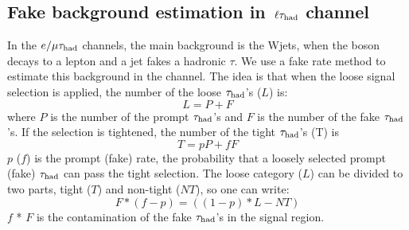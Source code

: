 \subsection{\texorpdfstring{Fake background estimation in $\,\ell\tau_{\rm had}$ channel}{Fake background estimation in lepton-tau channel}}
\label{sect:bkgLeptau}
In the $e/\mu\tau_{\rm had}$ channels, the main background is the Wjets, when the \Wpm boson decays to a lepton and a jet fakes a hadronic $\tau$.
We use a fake rate method to estimate this background \cite{CMS_AN_2010-261} in the \muTau channel.
The idea is that when the loose signal selection is applied, the number of the loose $\tau_{\rm had}$'s ($L$) is:
\begin{equation}
L = P + F
\end{equation}
where $P$ is the number of the  prompt $\tau_{\rm had}$'s and $F$ is the number of the  fake $\tau_{\rm had}$'s. If the selection is tightened, the number of the tight $\tau_{\rm had}$'s (T) is
\begin{equation}
 T = pP + fF
\end{equation} 
$p$ ($f$) is the prompt (fake) rate, the probability that a loosely selected prompt (fake) $\tau_{\rm had}$ can pass the  tight  selection. The loose category ($L$) can be divided to two parts, 
tight ($T$) and non-tight ($NT$), so one can write:
\begin{equation}
   F * (f - p) = ((1 - p) * L - NT)
\end{equation}
$f$ * $F$ is the contamination of the fake $\tau_{\rm had}$'s in the signal region. 

